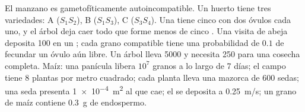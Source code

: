 \begin{problem}
\label{pb:b2:angiosperm-reproduction:1}
El manzano es gametofíticamente autoincompatible. Un huerto tiene tres
variedades: A ($S_1S_2$), B ($S_1S_3$), C ($S_3S_4$). Una  tiene
cinco  con dos óvulos cada uno, y el árbol deja caer todo 
que forme menos de cinco . Una visita de abeja deposita
\num{100}  en un ; cada grano compatible tiene una
probabilidad de $0.1$ de fecundar un óvulo aún libre. Un árbol lleva
\num{5000}  y necesita \num{250}  para una cosecha completa.
Maíz: una panícula libera
$10^{7}$ granos a lo largo de \num{7} días; el campo tiene \num{8}
plantas por metro cuadrado; cada planta lleva una mazorca de \num{600}
sedas; una seda
presenta \qty{1e-4}{m^2} al  que cae; el  se deposita a
\qty{0.25}{m/s}; un grano de maíz contiene \qty{0.3}{g} de endospermo.


\end{problem}
